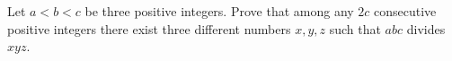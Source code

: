 Let $a<b<c$ be three positive integers. Prove that among any $2c$ consecutive positive integers there exist three different numbers $x,y,z$ such that $abc$ divides $xyz$.